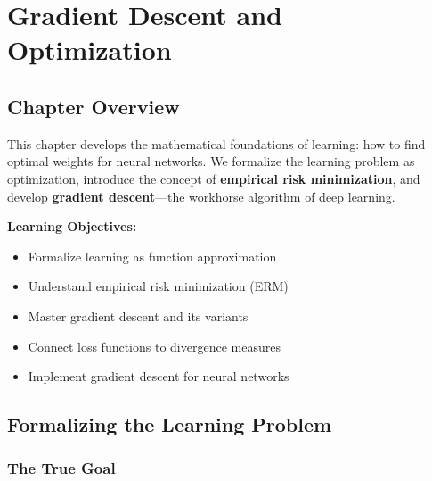 
\chapter{Gradient Descent and Optimization}
\label{ch:gradient_descent}


\section{Chapter Overview}

This chapter develops the mathematical foundations of learning: how to find optimal weights for neural networks. We formalize the learning problem as optimization, introduce the concept of \textbf{empirical risk minimization}, and develop \textbf{gradient descent}---the workhorse algorithm of deep learning.

\textbf{Learning Objectives:}
\begin{itemize}
    \item Formalize learning as function approximation
    \item Understand empirical risk minimization (ERM)
    \item Master gradient descent and its variants
    \item Connect loss functions to divergence measures
    \item Implement gradient descent for neural networks
\end{itemize}


\section{Formalizing the Learning Problem}

\subsection{The True Goal}


